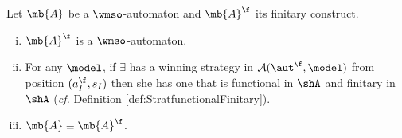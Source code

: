 \begin{proposition}\label{PROP_facts_finConstr} Let $\mb{A}$ be a $\wmso$-automaton and $\mb{A}^{\f}$ its finitary construct.
\begin{enumerate}[(i)]
   pt
  \item $\mb{A}^{\f}$ is a $\wmso$-automaton.\label{point:finConstrAut}
  \item For any $\model$, if $\exists$ has a winning strategy in $\mathcal{A}(\aut^{\f},\model)$ from position $(a_I^{\f},s_I)$ then she has one that is functional in $\shA$ and finitary in $\shA$ (\emph{cf.} Definition \ref{def:StratfunctionalFinitary}).
  \label{point:finConstrStrategy}
  \item $\mb{A} \equiv \mb{A}^{\f}$. \label{point:finConstrEquiv}
  \end{enumerate}
\end{proposition}
